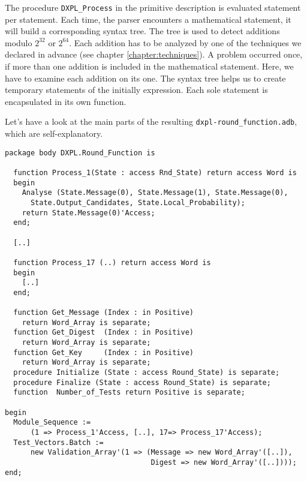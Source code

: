 \documentclass{acmtrans2m}
\begin{document}
The procedure \texttt{DXPL\_Process} in the primitive description is
evaluated statement per statement. Each time, the parser encounters
a mathematical statement, it will build a corresponding syntax tree. The
tree is used to detect additions modulo $2^{32}$ or $2^{64}$. Each addition
has to be analyzed by one of the techniques we declared in advance
(see chapter \ref{chapter:techniques}). A problem occurred once, if
more than one addition is included in the mathematical statement. Here,
we have to examine each addition on its one. The syntax tree helps us
to create temporary statements of the initially expression. Each sole
statement is encapsulated in its own function.

Let's have a look at the main parts of the resulting \texttt{dxpl-round\_function.adb},
which are self-explanatory.

\begin{lstlisting}[label=lst:five,caption=dxpl-round\_function.adb]
package body DXPL.Round_Function is

  function Process_1(State : access Rnd_State) return access Word is
  begin
    Analyse (State.Message(0), State.Message(1), State.Message(0),
      State.Output_Candidates, State.Local_Probability);
    return State.Message(0)'Access;
  end;

  [..]

  function Process_17 (..) return access Word is
  begin
    [..]
  end;

  function Get_Message (Index : in Positive)
    return Word_Array is separate;
  function Get_Digest  (Index : in Positive)
    return Word_Array is separate;
  function Get_Key     (Index : in Positive)
    return Word_Array is separate;
  procedure Initialize (State : access Round_State) is separate;
  procedure Finalize (State : access Round_State) is separate;
  function  Number_of_Tests return Positive is separate;

begin
  Module_Sequence :=
      (1 => Process_1'Access, [..], 17=> Process_17'Access);
  Test_Vectors.Batch :=
      new Validation_Array'(1 => (Message => new Word_Array'([..]), 
                                  Digest => new Word_Array'([..])));
end;
\end{lstlisting}
\end{document}
